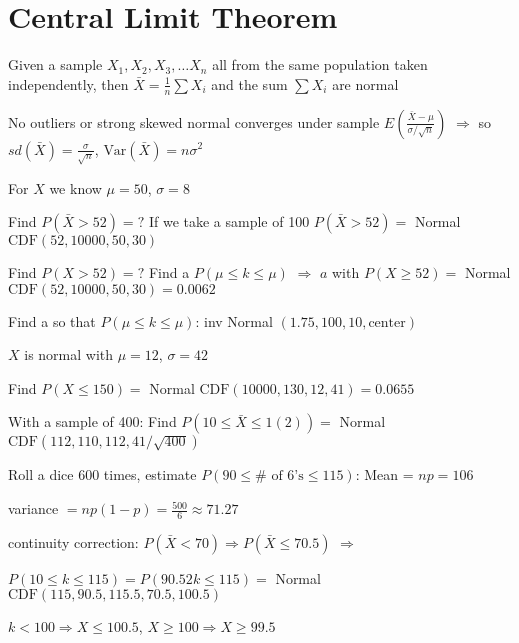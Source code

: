 \section{Central Limit Theorem}

Given a sample $X_1, X_2, X_3, \ldots X_n$ all from the same population taken independently, then $\bar{X} = \frac{1}{n} \sum X_i$ and the sum $\sum X_i$ are normal

No outliers or strong skewed normal converges under sample $E(\frac{\bar{X} - \mu}{\sigma/\sqrt{n}})$ $\Rightarrow$ so $sd(\bar{X}) = \frac{\sigma}{\sqrt{n}}$, $\text{Var}(\bar{X}) = n\sigma^2$

For $X$ we know $\mu = 50$, $\sigma = 8$

Find $P(\bar{X} > 52) = ?$ If we take a sample of 100 $P(\bar{X} > 52) = $ Normal $\text{CDF}(52, 10000, 50, 30)$

Find $P(X > 52) = ?$ Find a $P(\mu \leq k \leq \mu)$ $\Rightarrow$ $a$ with $P(X \geq 52) = $ Normal $\text{CDF}(52, 10000, 50, 30) = 0.0062$

Find a so that $P(\mu \leq k \leq \mu)$: inv Normal $(1.75, 100, 10, \text{center})$

\begin{example}
$X$ is normal with $\mu = 12$, $\sigma = 42$

Find $P(X \leq 150) = $ Normal $\text{CDF}(10000, 130, 12, 41) = 0.0655$

With a sample of 400: Find $P(10 \leq \bar{X} \leq 1(2)) = $ Normal $\text{CDF}(112, 110, 112, 41/\sqrt{400})$
\end{example}

\begin{example}
Roll a dice 600 times, estimate $P(90 \leq \# \text{ of } 6 \text{'s} \leq 115)$: Mean = $np = 106$

variance $= np(1 - p) = \frac{500}{6} \approx 71.27$

continuity correction: $P(\bar{X} < 70) \Rightarrow P(\bar{X} \leq 70.5)$ $\Rightarrow$

$P(10 \leq k \leq 115) = P(90.52 k \leq 115) = $ Normal $\text{CDF}(115, 90.5, 115.5, 70.5, 100.5)$

$k < 100 \Rightarrow X \leq 100.5$, $X \geq 100 \Rightarrow X \geq 99.5$
\end{example}
